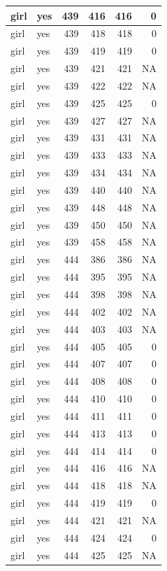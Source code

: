 \documentclass[man]{apa6}
\begin{document}
\begin{tabular}{l|l|r|r|r|r}
\hline
girl & yes & 439 & 416 & 416 & 0\\
\hline
girl & yes & 439 & 418 & 418 & 0\\
\hline
girl & yes & 439 & 419 & 419 & 0\\
\hline
girl & yes & 439 & 421 & 421 & NA\\
\hline
girl & yes & 439 & 422 & 422 & NA\\
\hline
girl & yes & 439 & 425 & 425 & 0\\
\hline
girl & yes & 439 & 427 & 427 & NA\\
\hline
girl & yes & 439 & 431 & 431 & NA\\
\hline
girl & yes & 439 & 433 & 433 & NA\\
\hline
girl & yes & 439 & 434 & 434 & NA\\
\hline
girl & yes & 439 & 440 & 440 & NA\\
\hline
girl & yes & 439 & 448 & 448 & NA\\
\hline
girl & yes & 439 & 450 & 450 & NA\\
\hline
girl & yes & 439 & 458 & 458 & NA\\
\hline
girl & yes & 444 & 386 & 386 & NA\\
\hline
girl & yes & 444 & 395 & 395 & NA\\
\hline
girl & yes & 444 & 398 & 398 & NA\\
\hline
girl & yes & 444 & 402 & 402 & NA\\
\hline
girl & yes & 444 & 403 & 403 & NA\\
\hline
girl & yes & 444 & 405 & 405 & 0\\
\hline
girl & yes & 444 & 407 & 407 & 0\\
\hline
girl & yes & 444 & 408 & 408 & 0\\
\hline
girl & yes & 444 & 410 & 410 & 0\\
\hline
girl & yes & 444 & 411 & 411 & 0\\
\hline
girl & yes & 444 & 413 & 413 & 0\\
\hline
girl & yes & 444 & 414 & 414 & 0\\
\hline
girl & yes & 444 & 416 & 416 & NA\\
\hline
girl & yes & 444 & 418 & 418 & NA\\
\hline
girl & yes & 444 & 419 & 419 & 0\\
\hline
girl & yes & 444 & 421 & 421 & NA\\
\hline
girl & yes & 444 & 424 & 424 & 0\\
\hline
girl & yes & 444 & 425 & 425 & NA\\

\end{tabular}
\end{document}
